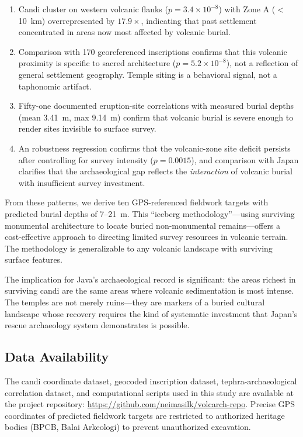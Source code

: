 \documentclass[12pt,a4paper]{article}
\begin{document}
\begin{enumerate}
    \item Candi cluster on western volcanic flanks ($p=3.4\times10^{-8}$) with Zone A ($<$10~km) overrepresented by $17.9\times$, indicating that past settlement concentrated in areas now most affected by volcanic burial.
    \item Comparison with 170 georeferenced inscriptions confirms that this volcanic proximity is specific to sacred architecture ($p=5.2\times10^{-8}$), not a reflection of general settlement geography. Temple siting is a behavioral signal, not a taphonomic artifact.
    \item Fifty-one documented eruption-site correlations with measured burial depths (mean 3.41~m, max 9.14~m) confirm that volcanic burial is severe enough to render sites invisible to surface survey.
    \item An robustness regression confirms that the volcanic-zone site deficit persists after controlling for survey intensity ($p=0.0015$), and comparison with Japan clarifies that the archaeological gap reflects the \emph{interaction} of volcanic burial with insufficient survey investment.
\end{enumerate}

From these patterns, we derive ten GPS-referenced fieldwork targets with predicted burial depths of 7--21~m. This ``iceberg methodology''---using surviving monumental architecture to locate buried non-monumental remains---offers a cost-effective approach to directing limited survey resources in volcanic terrain. The methodology is generalizable to any volcanic landscape with surviving surface features.

The implication for Java's archaeological record is significant: the areas richest in surviving candi are the same areas where volcanic sedimentation is most intense. The temples are not merely ruins---they are markers of a buried cultural landscape whose recovery requires the kind of systematic investment that Japan's rescue archaeology system demonstrates is possible.


\subsection*{Data Availability}

The candi coordinate dataset, geocoded inscription dataset, tephra-archaeological correlation dataset, and computational scripts used in this study are available at the project repository: \url{https://github.com/neimasilk/volcarch-repo}. Precise GPS coordinates of predicted fieldwork targets are restricted to authorized heritage bodies (BPCB, Balai Arkeologi) to prevent unauthorized excavation.
\end{document}
